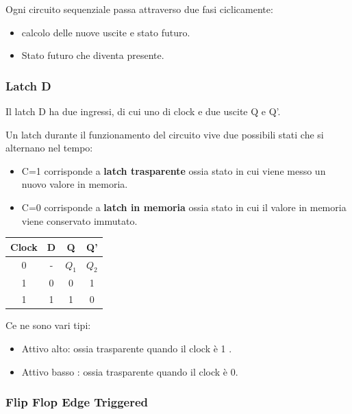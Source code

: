 \documentclass[a4paper]{book}
\begin{document}
Ogni circuito sequenziale passa attraverso due fasi ciclicamente:
\begin{itemize}
\item{} calcolo delle nuove uscite e stato futuro.
\item{} Stato futuro che diventa presente.
\end{itemize}


\subsubsection{Latch D}

Il latch D ha due ingressi, di cui uno di clock e due uscite Q e Q'.

Un latch durante il funzionamento del circuito vive due possibili stati che si alternano nel tempo:

\begin{itemize}
\item C=1 corrisponde a \textbf{latch trasparente} ossia stato in cui viene messo un nuovo valore in memoria.
\item C=0 corrisponde a \textbf{latch in memoria} ossia stato in cui il valore in memoria viene conservato immutato.
\end{itemize}	


\begin{tabular}{|c|c|c|c|}
\hline
Clock & D & Q   & Q' \\
\hline
0     & - & \(Q_1\) & \(Q_2\)\\
\hline
1     & 0 & 0   & 1  \\
\hline
1     & 1 & 1   & 0  \\
\hline
\end{tabular}



Ce ne sono vari tipi:

\begin{itemize}
\item{Attivo alto}: ossia trasparente quando il clock è 1 .
\item{Attivo basso} : ossia trasparente quando il clock è 0.
\end{itemize}



\subsubsection{Flip Flop Edge Triggered} 
\end{document}
